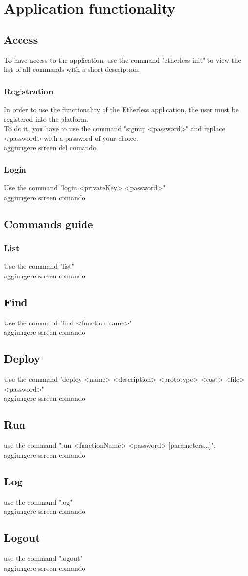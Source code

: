 \section{Application functionality}
\subsection{Access}
To have access to the application, use the command "etherless init" to view the list of all commands with a short description.

\subsubsection{Registration}
In order to use the functionality of the Etherless application, the user must be registered into the platform.\\
To do it, you have to use the command "signup <password>" and replace <password>  with a password of your choice.
\\
aggiungere screen del comando 

\subsubsection{Login}
Use the command "login <privateKey> <password>"
\\aggiungere screen comando


\subsection{Commands guide}
\subsubsection{List}
Use the command "list"
\\aggiungere screen comando


\subsection{Find}
Use the command "find <function name>"
\\aggiungere screen comando

\subsection{Deploy}
Use the command "deploy <name> <description> <prototype> <cost> <file> <password>"
\\aggiungere screen comando

\subsection{Run}
use the command "run <functionName> <password> [parameters...]". \\aggiungere screen comando

\subsection{Log}
use the command "log"\\
aggiungere screen comando

\subsection{Logout}
use the command "logout"
\\aggiungere screen comando


